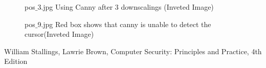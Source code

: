 \documentclass[12pt]{article}
\newenvironment{QandA}
{
	\begin{enumerate}[label=\normalfont\arabic*.,leftmargin=2em,rightmargin=2em]\normalfont
	}
	{
	\end{enumerate}
}
\newenvironment{answered}{\setlength{\parindent}{1em}\par\normalfont}{}
\begin{document}
\begin{QandA}
\begin{answered}
\begin{figure}
		\centering
  			\caption{pos$\_$3.jpg Using Canny after 3 downscalings (Inveted Image)}
  		\label{wow-canny-wow}
\end{figure}
\begin{figure}
		\centering
  			\caption{pos$\_$9.jpg Red box shows that canny is unable to detect the cursor(Inveted Image)}
  		\label{canny-problem}
\end{figure}
\end{answered}
\end{QandA}
	\begin{thebibliography}{1}
							 William Stallings, Lawrie Brown, Computer Security: Principles and Practice, 4th Edition
	\end{thebibliography}
\end{document}
